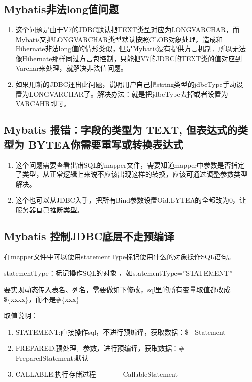 \documentclass[a4,10pt,oneside,english]{sphinxmanual}
\begin{document}
\subsection{Mybatis非法long值问题}
\label{\detokenize{interface/mybatis:mybatislong}}\begin{enumerate}
%
\item {} 
这个问题是由于V7的JDBC默认把TEXT类型对应为LONGVARCHAR，而Mybatis又把LONGVARCHAR类型默认按照CLOB对象处理，造成和Hibernate非法long值的情形类似，但是Mybatis没有提供方言机制，所以无法像Hibernate那样同过方言包控制，只能把V7的JDBC的TEXT类的值对应到Varchar来处理，就解决非法值问题。

\item {} 
如果用新的JDBC还出此问题，说明用户自己把string类型的jdbcType手动设置为LONGVARCHAR了。解决办法：就是把jdbcType去掉或者设置为VARCAHR即可。

\end{enumerate}


\subsection{Mybatis 报错：字段的类型为 TEXT, 但表达式的类型为 BYTEA你需要重写或转换表达式}
\label{\detokenize{interface/mybatis:mybatis-text-bytea}}\begin{enumerate}
%
\item {} 
这个问题需要查看出错SQL的mapper文件，需要知道mapper中参数是否指定了类型，从正常逻辑上来说不应该出现这样的转换，应该可通过调整参数类型解决。

\item {} 
这个也可以从JDBC入手，把所有Bind参数设置Oid.BYTEA的全都改为0，让服务器自己推断类型。

\end{enumerate}


\subsection{Mybatis 控制JDBC底层不走预编译}
\label{\detokenize{interface/mybatis:mybatis-jdbc}}
在mapper文件中可以使用statementType标记使用什么的对象操作SQL语句。

statementType：标记操作SQL的对象 ，如statementType=”STATEMENT”

要实现动态传入表名、列名，需要做如下修改，sql里的所有变量取值都改成\$\{xxxx\}，而不是\#\{xxx\}

取值说明：
\begin{enumerate}
%
\item {} 
STATEMENT:直接操作sql，不进行预编译，获取数据：\$—Statement

\item {} 
PREPARED:预处理，参数，进行预编译，获取数据：\#—–PreparedStatement:默认

\item {} 
CALLABLE:执行存储过程————CallableStatement

\end{enumerate}
\end{document}
